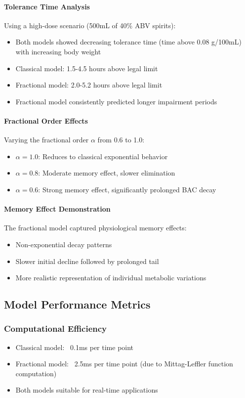 \documentclass[12pt]{article}
\begin{document}
\paragraph{Tolerance Time Analysis}
Using a high-dose scenario (500mL of 40\% ABV spirits):
\begin{itemize}
    \item Both models showed decreasing tolerance time (time above 0.08 g/100mL) with increasing body weight
    \item Classical model: 1.5-4.5 hours above legal limit
    \item Fractional model: 2.0-5.2 hours above legal limit
    \item Fractional model consistently predicted longer impairment periods
\end{itemize}

\paragraph{Fractional Order Effects}
Varying the fractional order $\alpha$ from 0.6 to 1.0:
\begin{itemize}
    \item $\alpha = 1.0$: Reduces to classical exponential behavior
    \item $\alpha = 0.8$: Moderate memory effect, slower elimination
    \item $\alpha = 0.6$: Strong memory effect, significantly prolonged BAC decay
\end{itemize}

\paragraph{Memory Effect Demonstration}
The fractional model captured physiological memory effects:
\begin{itemize}
    \item Non-exponential decay patterns
    \item Slower initial decline followed by prolonged tail
    \item More realistic representation of individual metabolic variations
\end{itemize}

\subsection{Model Performance Metrics}

\subsubsection{Computational Efficiency}
\begin{itemize}
    \item Classical model: ~0.1ms per time point
    \item Fractional model: ~2.5ms per time point (due to Mittag-Leffler function computation)
    \item Both models suitable for real-time applications
\end{itemize}
\end{document}
